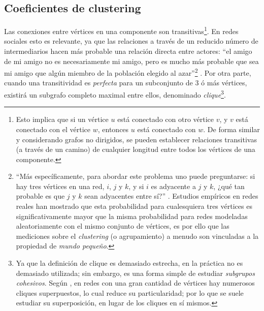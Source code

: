 \documentclass[letterpaper, 11pt]{book}
\theoremstyle{definition}
\theoremstyle{remark}
\begin{document}
\subsection{Coeficientes de clustering}
\label{sec:CoeficienteClustering}
Las conexiones entre vértices en una componente son transitivas\footnote{
    Esto implica que si un vértice $u$ está conectado con otro vértice $v$, y $v$ está conectado con el vértice $w$, entonces $u$ está conectado con $w$. 
    De forma similar y considerando grafos no dirigidos, se pueden establecer relaciones transitivas (a través de un camino) de cualquier longitud entre todos los vértices de una componente.
}. 
En redes sociales esto es relevante, ya que las relaciones a través de un reducido número de intermediarios hacen más probable una relación directa entre actores: ``el amigo de mi amigo no es necesariamente mi amigo, pero es mucho más probable que sea mi amigo que algún miembro de la población elegido al azar''\footnote{
    ``Más específicamente, para abordar este problema uno puede preguntarse: si hay tres vértices en una red, $i$, $j$ y $k$, y si $i$ es adyacente a $j$ y $k$, ¿qué tan probable es que $j$ y $k$ sean adyacentes entre sí?'' \citep[155]{2009_Clustering_Opsahl}. 
    Estudios empíricos en redes reales han mostrado que esta probabilidad para cualesquiera tres vértices es significativamente mayor que la misma probabilidad para redes modeladas aleatoriamente con el mismo conjunto de vértices, es por ello que las mediciones sobre el \emph{clustering} (o agrupamiento) a menudo son vinculadas a la propiedad de \emph{mundo pequeño}. 
} 
\citep[200]{2010_Newman_Networks}. 
Por otra parte, cuando una transitividad es \emph{perfecta} para un subconjunto de 3 ó más vértices, existirá un subgrafo completo maximal entre ellos, denominado \emph{clique}\footnote{
    Ya que la definición de clique es demasiado estrecha, en la práctica no es demasiado utilizada; sin embargo, es una forma simple de estudiar \emph{subgrupos cohesivos}. 
    Según \citet{1994_Wasserman_SNA}, en redes con una gran cantidad de vértices hay numerosos cliques superpuestos, lo cual reduce su particularidad; por lo que se suele estudiar su superposición, en lugar de los cliques en sí mismos. 
}.
\end{document}
